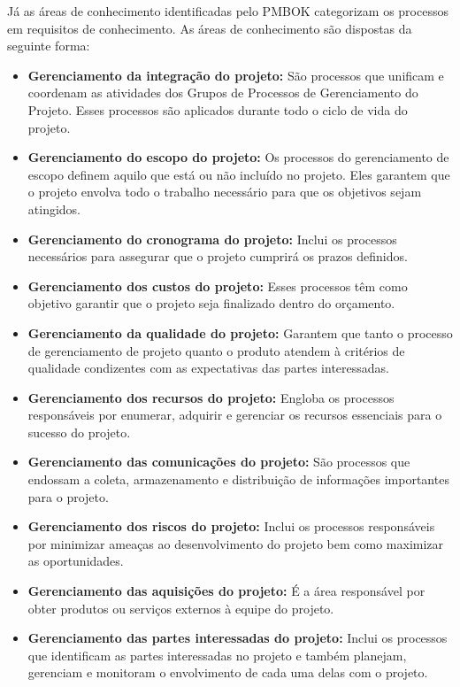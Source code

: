 \documentclass[
    12pt,       %
    openright,      %
    twoside,      %
    a4paper,      %
    english,      %
    french,       %
    spanish,      %
    brazil,       %
    ]{abntex2}
\begin{document}
Já as áreas de conhecimento identificadas pelo PMBOK \cite{PMBOK:2017} categorizam os processos em requisitos de conhecimento. As áreas de conhecimento são dispostas da seguinte forma:

\begin{itemize}
    \item \textbf{Gerenciamento da integração do projeto:} São processos que unificam e coordenam as atividades dos Grupos de Processos de Gerenciamento do Projeto. Esses processos são aplicados durante todo o ciclo de vida do projeto.
    \item \textbf{Gerenciamento do escopo do projeto:} Os processos do gerenciamento de escopo definem aquilo que está ou não incluído no projeto. Eles garantem que o projeto envolva todo o trabalho necessário para que os objetivos sejam atingidos.
    \item \textbf{Gerenciamento do cronograma do projeto:} Inclui os processos necessários para assegurar que o projeto cumprirá os prazos definidos.
    \item \textbf{Gerenciamento dos custos do projeto:} Esses processos têm como objetivo garantir que o projeto seja finalizado dentro do orçamento.
    \item \textbf{Gerenciamento da qualidade do projeto:} Garantem que tanto o processo de gerenciamento de projeto quanto o produto atendem à critérios de qualidade condizentes com as expectativas das partes interessadas.
    \item \textbf{Gerenciamento dos recursos do projeto:} Engloba os processos responsáveis por enumerar, adquirir e gerenciar os recursos essenciais para o sucesso do projeto.
    \item \textbf{Gerenciamento das comunicações do projeto:} São processos que endossam a coleta, armazenamento e distribuição de informações importantes para o projeto.
    \item \textbf{Gerenciamento dos riscos do projeto:} Inclui os processos responsáveis por minimizar ameaças ao desenvolvimento do projeto bem como maximizar as oportunidades.
    \item \textbf{Gerenciamento das aquisições do projeto:} É a área responsável por obter produtos ou serviços externos à equipe do projeto.
    \item \textbf{Gerenciamento das partes interessadas do projeto:} Inclui os processos que identificam as partes interessadas no projeto e também planejam, gerenciam e monitoram o envolvimento de cada uma delas com o projeto.
\end{itemize}
\end{document}
